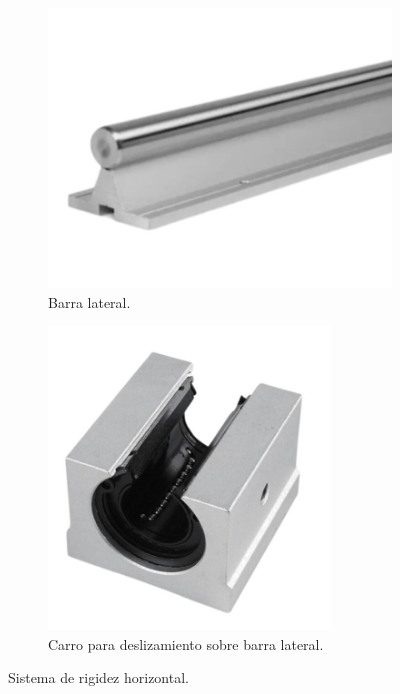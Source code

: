 \begin{figure}[H]
    \centering
    \begin{subfigure}{0.35\textwidth}
        \centering
        \includegraphics[width=\textwidth]{img/barra_lateral.png}
        \caption{Barra lateral.}
        \label{fig:barra_lateral}
    \end{subfigure}
    \hfill
    \begin{subfigure}{0.3\textwidth}
        \centering
        \includegraphics[width=\textwidth]{img/sbr20uu.png}
        \caption{Carro para deslizamiento sobre barra lateral.}
        \label{fig:sbr20uu}
    \end{subfigure}
    \caption{Sistema de rigidez horizontal.}
\end{figure}

